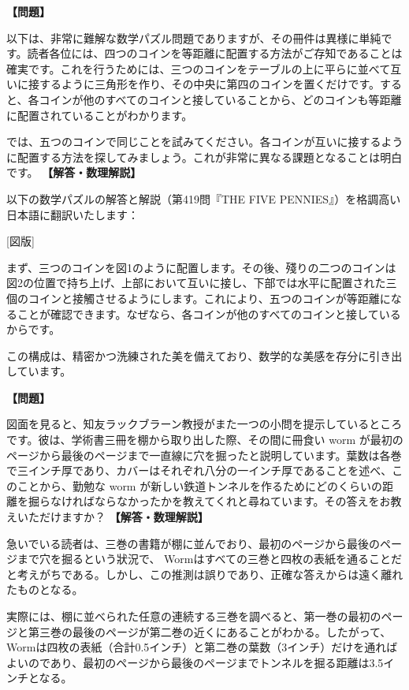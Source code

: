 \documentclass[10pt,a4paper,oneside,openany]{ltjsbook}
\begin{document}
\begin{tcolorbox}[colback=softblue,colframe=primaryblue,title=\textbf{第 419 問：五ペンスの謎題 （原題: THE FIVE PENNIES.）},arc=2mm,boxrule=1pt,breakable]
\textbf{【問題】}\par\vspace{0.3em}
以下は、非常に難解な数学パズル問題でありますが、その冊件は異様に単純です。読者各位には、四つのコインを等距離に配置する方法がご存知であることは確実です。これを行うためには、三つのコインをテーブルの上に平らに並べて互いに接するように三角形を作り、その中央に第四のコインを置くだけです。すると、各コインが他のすべてのコインと接していることから、どのコインも等距離に配置されていることがわかります。

では、五つのコインで同じことを試みてください。各コインが互いに接するように配置する方法を探してみましょう。これが非常に異なる課題となることは明白です。
\tcblower
\textbf{【解答・数理解説】}\par\vspace{0.3em}
以下の数学パズルの解答と解説（第419問『THE FIVE PENNIES』）を格調高い日本語に翻訳いたします：

[図版]

まず、三つのコインを図1のように配置します。その後、殘りの二つのコインは図2の位置で持ち上げ、上部において互いに接し、下部では水平に配置された三個のコインと接觸させるようにします。これにより、五つのコインが等距離になることが確認できます。なぜなら、各コインが他のすべてのコインと接しているからです。

この構成は、精密かつ洗練された美を備えており、数学的な美感を存分に引き出しています。
\end{tcolorbox}

\begin{tcolorbox}[colback=softblue,colframe=primaryblue,title=\textbf{第 420 問：勤勉な冊worm （原題: THE INDUSTRIOUS BOOKWORM.）},arc=2mm,boxrule=1pt,breakable]
\textbf{【問題】}\par\vspace{0.3em}
図面を見ると、知友ラックブラーン教授がまた一つの小問を提示しているところです。彼は、学術書三冊を棚から取り出した際、その間に冊食い worm が最初のページから最後のページまで一直線に穴を掘ったと説明しています。葉数は各巻で三インチ厚であり、カバーはそれぞれ八分の一インチ厚であることを述べ、このことから、勤勉な worm が新しい鉄道トンネルを作るためにどのくらいの距離を掘らなければならなかったかを教えてくれと尋ねています。その答えをお教えいただけますか？
\tcblower
\textbf{【解答・数理解説】}\par\vspace{0.3em}
急いでいる読者は、三巻の書籍が棚に並んでおり、最初のページから最後のページまで穴を掘るという狀況で、 Wormはすべての三巻と四枚の表紙を通ることだと考えがちである。しかし、この推測は誤りであり、正確な答えからは遠く離れたものとなる。

実際には、棚に並べられた任意の連続する三巻を調べると、第一巻の最初のページと第三巻の最後のページが第二巻の近くにあることがわかる。したがって、Wormは四枚の表紙（合計0.5インチ）と第二巻の葉数（3インチ）だけを通ればよいのであり、最初のページから最後のページまでトンネルを掘る距離は3.5インチとなる。
\end{tcolorbox}
\end{document}
